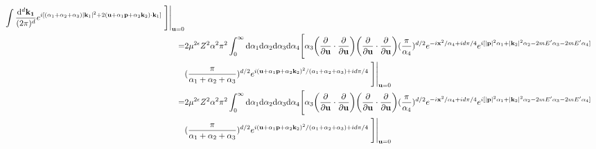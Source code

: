 \documentclass[aps,prd,preprint,showkeys,notitlepage,10pt]{revtex4-1}
\newcommand{\vbp}{\vb{p}}
\newcommand{\vbk}{\vb{k}}
\renewcommand{\a}{\alpha}
\begin{document}
\begin{align*}
	\int\frac{\dd^d\vb{k_1}}{(2\pi)^d}e^{i[(\a_1+\a_2+\a_3)\abs{\vbk_1}^2+2(\vb{u}+\a_1\vbp+\a_2\vbk_2)\cdot\vbk_1]} \eval{\Bigg]}_{\vb{u}=0}\\
	=&2\mu^{2\epsilon}Z^2\a^2\pi^2
	\int_0^{\infty}\dd\a_1\dd\a_2\dd\a_3\dd\a_4\Bigg[\a_3\pqty{\pdv{\vb{u}}\cdot\pdv{\vb{u}}}\pqty{\pdv{\vb{u}}\cdot\pdv{\vb{u}}}
	(\frac{\pi}{\a_4})^{d/2}e^{-i\vb{x}^2/{\a_4}+id\pi/4}
	e^{i[\abs{\vbp}^2\a_1+\abs{\vbk_2}^2\a_2-2mE'\a_3-2mE'\a_4]}\\&
	(\frac{\pi}{\a_1+\a_2+\a_3})^{d/2}e^{i(\vb{u}+\a_1\vbp+\a_2\vbk_2)^2/(\a_1+\a_2+\a_3)+id\pi/4}\eval{\Bigg]}_{\vb{u}=0}\\
	=&2\mu^{2\epsilon}Z^2\a^2\pi^2
	\int_0^{\infty}\dd\a_1\dd\a_2\dd\a_3\dd\a_4\Bigg[\a_3\pqty{\pdv{\vb{u}}\cdot\pdv{\vb{u}}}\pqty{\pdv{\vb{u}}\cdot\pdv{\vb{u}}}
	(\frac{\pi}{\a_4})^{d/2}e^{-i\vb{x}^2/{\a_4}+id\pi/4}
	e^{i[\abs{\vbp}^2\a_1+\abs{\vbk_2}^2\a_2-2mE'\a_3-2mE'\a_4]}\\&
	(\frac{\pi}{\a_1+\a_2+\a_3})^{d/2}e^{i(\vb{u}+\a_1\vbp+\a_2\vbk_2)^2/(\a_1+\a_2+\a_3)+id\pi/4}\eval{\Bigg]}_{\vb{u}=0}
\end{align*}
\end{document}
